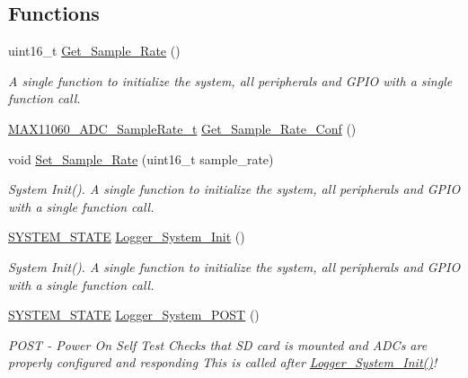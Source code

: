 \subsection*{Functions}
\begin{DoxyCompactItemize}
\item 
uint16\+\_\+t \hyperlink{group__system_ga9635ffa654efc23cfeb69139d77e83be}{Get\+\_\+\+Sample\+\_\+\+Rate} ()
\begin{DoxyCompactList}\small\item\em A single function to initialize the system, all peripherals and G\+P\+I\+O with a single function call. \end{DoxyCompactList}\item 
\hyperlink{group__max11060_ga2a33837c760006578f634282dafeeee8}{M\+A\+X11060\+\_\+\+A\+D\+C\+\_\+\+Sample\+Rate\+\_\+t} \hyperlink{group__system_gab966eb544f76e369a5c194e2d246995e}{Get\+\_\+\+Sample\+\_\+\+Rate\+\_\+\+Conf} ()
\item 
void \hyperlink{group__system_ga1283397b79ed1a9932dfb5673ffa81b5}{Set\+\_\+\+Sample\+\_\+\+Rate} (uint16\+\_\+t sample\+\_\+rate)
\begin{DoxyCompactList}\small\item\em System Init(). A single function to initialize the system, all peripherals and G\+P\+I\+O with a single function call. \end{DoxyCompactList}\item 
\hyperlink{group__system_gafeac06fb8e1e94bfba7df88a6e219d71}{S\+Y\+S\+T\+E\+M\+\_\+\+S\+T\+A\+T\+E} \hyperlink{group__system_ga140103062d2e414b6b642ffedb3bb03a}{Logger\+\_\+\+System\+\_\+\+Init} ()
\begin{DoxyCompactList}\small\item\em System Init(). A single function to initialize the system, all peripherals and G\+P\+I\+O with a single function call. \end{DoxyCompactList}\item 
\hyperlink{group__system_gafeac06fb8e1e94bfba7df88a6e219d71}{S\+Y\+S\+T\+E\+M\+\_\+\+S\+T\+A\+T\+E} \hyperlink{group__system_ga189a2877aaf3e09f63623f62061d4a42}{Logger\+\_\+\+System\+\_\+\+P\+O\+S\+T} ()
\begin{DoxyCompactList}\small\item\em P\+O\+S\+T -\/ Power On Self Test Checks that S\+D card is mounted and A\+D\+C\textquotesingle{}s are properly configured and responding This is called after \hyperlink{group__system_ga140103062d2e414b6b642ffedb3bb03a}{Logger\+\_\+\+System\+\_\+\+Init()}! \end{DoxyCompactList}\item 

\end{DoxyCompactItemize}
